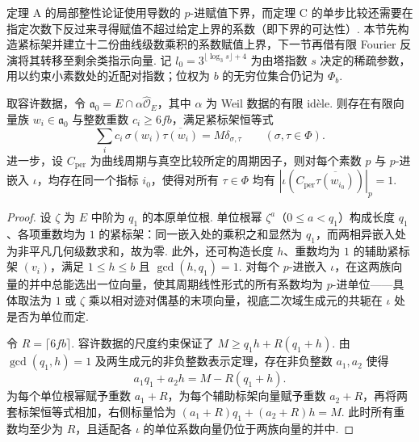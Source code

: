 定理 A 的局部整性论证使用导数的 $p$-进赋值下界，而定理 C 的单步比较还需要在指定次数下反过来寻得赋值不超过给定上界的系数（即下界的可达性）. 本节先构造紧标架并建立十二份曲线级数乘积的系数赋值上界，下一节再借有限 Fourier 反演将其转移至剩余类指示向量. 记 $l_0=3^{\lfloor\log_3 s\rfloor+4}$ 为由塔指数 $s$ 决定的稀疏参数，用以约束小素数处的近配对指数；位权为 $b$ 的无穷位集合仍记为 $\Phi_b$.

\begin{lemma}[主层上具有单位系数的紧标架]
\label{lem:c-derivative-frame}
\emitthmsource
取容许数据，令 $\mathfrak a_0=E\cap\alpha\widehat{\mathcal O}_E$，其中 $\alpha$ 为 Weil 数据的有限 idèle. 则存在有限向量族 $w_i\in\mathfrak a_0$ 与整数重数 $c_i\ge6fb$，满足紧标架恒等式
\[
       \sum_i c_i\,\sigma(w_i)\overline{\tau(w_i)}
        =M\delta_{\sigma,\tau}
        \qquad(\sigma,\tau\in\Phi).
\]
进一步，设 $C_{\mathrm{per}}$ 为曲线周期与真空比较所定的周期因子，则对每个素数 $p$ 与 $p$-进嵌入 $\iota$，均存在同一个指标 $i_0$，使得对所有 $\tau\in\Phi$ 均有 $|\iota(C_{\mathrm{per}}\overline{\tau(w_{i_0})})|_p=1$.
\end{lemma}

\begin{proof}
设 $\zeta$ 为 $E$ 中阶为 $q_1$ 的本原单位根. 单位根幂 $\zeta^a$（$0\le a<q_1$）构成长度 $q_1$、各项重数均为 $1$ 的紧标架：同一嵌入处的乘积之和显然为 $q_1$，而两相异嵌入处为非平凡几何级数求和，故为零. 此外，还可构造长度 $h$、重数均为 $1$ 的辅助紧标架 $(v_i)$，满足 $1\le h\le b$ 且 $\gcd(h,q_1)=1$. 对每个 $p$-进嵌入 $\iota$，在这两族向量的并中总能选出一位向量，使其周期线性形式的所有系数均为 $p$-进单位——具体取法为 $1$ 或 $\zeta$ 乘以相对迹对偶基的末项向量，视底二次域生成元的共轭在 $\iota$ 处是否为单位而定.

令 $R=\lceil6fb\rceil$. 容许数据的尺度约束保证了 $M\ge q_1h+R(q_1+h)$. 由 $\gcd(q_1,h)=1$ 及两生成元的非负整数表示定理，存在非负整数 $a_1,a_2$ 使得
\[
 a_1q_1+a_2h=M-R(q_1+h).
\]
为每个单位根幂赋予重数 $a_1+R$，为每个辅助标架向量赋予重数 $a_2+R$，再将两套标架恒等式相加，右侧标量恰为 $(a_1+R)q_1+(a_2+R)h=M$. 此时所有重数均至少为 $R$，且适配各 $\iota$ 的单位系数向量仍位于两族向量的并中.
\end{proof}

